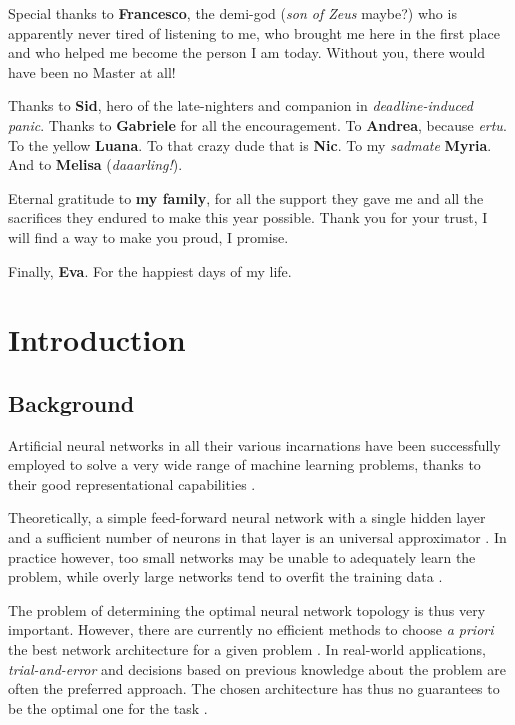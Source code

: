 \documentclass[11pt,a4paper]{report}
\begin{document}
	Special thanks to \textbf{Francesco}, the demi-god (\emph{son of Zeus} maybe?) who is apparently never tired of listening to me, who brought me here in the first place and who helped me become the person I am today. Without you, there would have been no Master at all!
	
	Thanks to \textbf{Sid}, hero of the late-nighters and companion in \emph{deadline-induced panic}. Thanks to \textbf{Gabriele} for all the encouragement. To \textbf{Andrea}, because \emph{ertu}. To the yellow \textbf{Luana}. To that crazy dude that is \textbf{Nic}. To my \emph{sadmate} \textbf{Myria}. And to \textbf{Melisa} (\emph{daaarling!}).
	
	Eternal gratitude to \textbf{my family}, for all the support they gave me and all the sacrifices they endured to make this year possible. Thank you for your trust, I will find a way to make you proud, I promise.
	
	Finally, \textbf{Eva}. For the happiest days of my life.
	
	
	\renewcommand*\contentsname{Table of Contents}
	\tableofcontents

	\printnomenclature[0.7in]
	\listoffigures
	\listoftables
	
	
	\chapter{Introduction}
		\section{Background}
			\label{sec:background}
			Artificial neural networks in all their various incarnations have been successfully employed to solve a very wide range of machine learning problems, thanks to their good representational capabilities \cite{sharma2010constructive}.
		
		
			Theoretically, a simple feed-forward neural network with a single hidden layer and a sufficient number of neurons in that layer is an universal approximator \cite{hornik1989multilayer,kuurkova1992kolmogorov}. In practice however, too small networks may be unable to adequately learn the problem, while overly large networks tend to overfit the training data \cite{parekh2000constructive}.
		
			The problem of determining the optimal neural network topology is thus very important. However, there are currently no efficient methods to choose \emph{a priori} the best network architecture for a given problem \cite{parekh2000constructive}. In real-world applications, \emph{trial-and-error} and decisions based on previous knowledge about the problem are often the preferred approach. The chosen architecture has thus no guarantees to be the optimal one for the task \cite{sharma2010constructive}.
		
\end{document}

